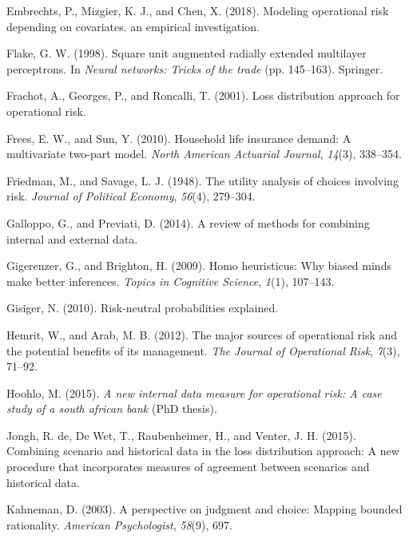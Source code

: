 \documentclass[]{DissertateUSU}
\begin{document}
\hypertarget{ref-embrechts2018modeling}{}
Embrechts, P., Mizgier, K. J., and Chen, X. (2018). Modeling operational
risk depending on covariates. an empirical investigation.

\hypertarget{ref-flake1998square}{}
Flake, G. W. (1998). Square unit augmented radially extended multilayer
perceptrons. In \emph{Neural networks: Tricks of the trade} (pp.
145--163). Springer.

\hypertarget{ref-frachot2001loss}{}
Frachot, A., Georges, P., and Roncalli, T. (2001). Loss distribution
approach for operational risk.

\hypertarget{ref-frees2010household}{}
Frees, E. W., and Sun, Y. (2010). Household life insurance demand: A
multivariate two-part model. \emph{North American Actuarial Journal},
\emph{14}(3), 338--354.

\hypertarget{ref-friedman1948utility}{}
Friedman, M., and Savage, L. J. (1948). The utility analysis of choices
involving risk. \emph{Journal of Political Economy}, \emph{56}(4),
279--304.

\hypertarget{ref-galloppo2014review}{}
Galloppo, G., and Previati, D. (2014). A review of methods for combining
internal and external data.

\hypertarget{ref-gigerenzer2009homo}{}
Gigerenzer, G., and Brighton, H. (2009). Homo heuristicus: Why biased
minds make better inferences. \emph{Topics in Cognitive Science},
\emph{1}(1), 107--143.

\hypertarget{ref-gisiger2010risk}{}
Gisiger, N. (2010). Risk-neutral probabilities explained.

\hypertarget{ref-hemrit2012major}{}
Hemrit, W., and Arab, M. B. (2012). The major sources of operational
risk and the potential benefits of its management. \emph{The Journal of
Operational Risk}, \emph{7}(3), 71--92.

\hypertarget{ref-hoohlo2015new}{}
Hoohlo, M. (2015). \emph{A new internal data measure for operational
risk: A case study of a south african bank} (PhD thesis).

\hypertarget{ref-de2015combining}{}
Jongh, R. de, De Wet, T., Raubenheimer, H., and Venter, J. H. (2015).
Combining scenario and historical data in the loss distribution
approach: A new procedure that incorporates measures of agreement
between scenarios and historical data.

\hypertarget{ref-kahneman2003perspective}{}
Kahneman, D. (2003). A perspective on judgment and choice: Mapping
bounded rationality. \emph{American Psychologist}, \emph{58}(9), 697.
\end{document}
